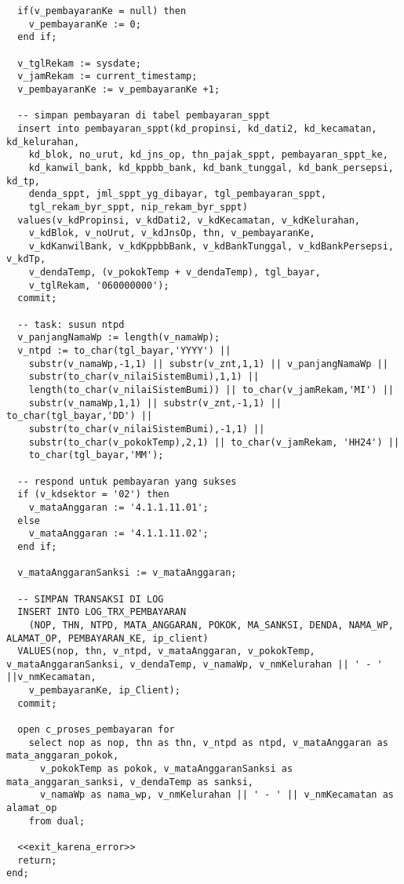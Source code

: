 \documentclass[pdftex,12pt, oneside]{article}
\begin{document}
\begin{lstlisting}
  if(v_pembayaranKe = null) then
    v_pembayaranKe := 0;
  end if;

  v_tglRekam := sysdate;
  v_jamRekam := current_timestamp;
  v_pembayaranKe := v_pembayaranKe +1;

  -- simpan pembayaran di tabel pembayaran_sppt
  insert into pembayaran_sppt(kd_propinsi, kd_dati2, kd_kecamatan, kd_kelurahan,
    kd_blok, no_urut, kd_jns_op, thn_pajak_sppt, pembayaran_sppt_ke,
    kd_kanwil_bank, kd_kppbb_bank, kd_bank_tunggal, kd_bank_persepsi, kd_tp,
    denda_sppt, jml_sppt_yg_dibayar, tgl_pembayaran_sppt,
    tgl_rekam_byr_sppt, nip_rekam_byr_sppt)
  values(v_kdPropinsi, v_kdDati2, v_kdKecamatan, v_kdKelurahan,
    v_kdBlok, v_noUrut, v_kdJnsOp, thn, v_pembayaranKe,
    v_kdKanwilBank, v_kdKppbbBank, v_kdBankTunggal, v_kdBankPersepsi, v_kdTp,
    v_dendaTemp, (v_pokokTemp + v_dendaTemp), tgl_bayar,
    v_tglRekam, '060000000');
  commit;

  -- task: susun ntpd
  v_panjangNamaWp := length(v_namaWp);
  v_ntpd := to_char(tgl_bayar,'YYYY') ||
    substr(v_namaWp,-1,1) || substr(v_znt,1,1) || v_panjangNamaWp ||
    substr(to_char(v_nilaiSistemBumi),1,1) ||
    length(to_char(v_nilaiSistemBumi)) || to_char(v_jamRekam,'MI') ||
    substr(v_namaWp,1,1) || substr(v_znt,-1,1) || to_char(tgl_bayar,'DD') ||
    substr(to_char(v_nilaiSistemBumi),-1,1) ||
    substr(to_char(v_pokokTemp),2,1) || to_char(v_jamRekam, 'HH24') ||
    to_char(tgl_bayar,'MM');

  -- respond untuk pembayaran yang sukses
  if (v_kdsektor = '02') then
    v_mataAnggaran := '4.1.1.11.01';
  else
    v_mataAnggaran := '4.1.1.11.02';
  end if;

  v_mataAnggaranSanksi := v_mataAnggaran;

  -- SIMPAN TRANSAKSI DI LOG
  INSERT INTO LOG_TRX_PEMBAYARAN
    (NOP, THN, NTPD, MATA_ANGGARAN, POKOK, MA_SANKSI, DENDA, NAMA_WP, ALAMAT_OP, PEMBAYARAN_KE, ip_client)
  VALUES(nop, thn, v_ntpd, v_mataAnggaran, v_pokokTemp, v_mataAnggaranSanksi, v_dendaTemp, v_namaWp, v_nmKelurahan || ' - ' ||v_nmKecamatan,
    v_pembayaranKe, ip_Client);
  commit;

  open c_proses_pembayaran for
    select nop as nop, thn as thn, v_ntpd as ntpd, v_mataAnggaran as mata_anggaran_pokok,
      v_pokokTemp as pokok, v_mataAnggaranSanksi as mata_anggaran_sanksi, v_dendaTemp as sanksi,
      v_namaWp as nama_wp, v_nmKelurahan || ' - ' || v_nmKecamatan as alamat_op
    from dual;

  <<exit_karena_error>>
  return;
end;
  \end{lstlisting}
\end{document}
